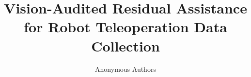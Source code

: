 \documentclass[10pt,letterpaper]{article}
\title{Vision-Audited Residual Assistance for Robot Teleoperation Data Collection}
\author{Anonymous Authors}
\date{}
\begin{document}
\maketitle

\begin{abstract}

\end{abstract}










\end{document}
